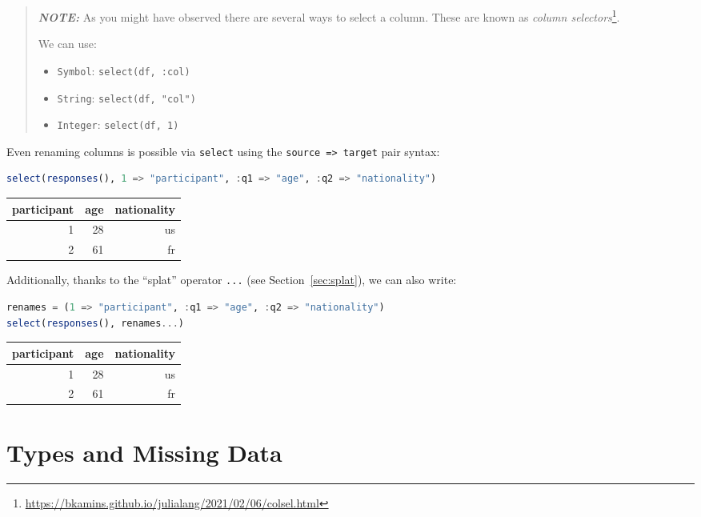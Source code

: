 \documentclass[
  notoc %
]{tufte-book}
\DeclareRobustCommand{\href}[2]{#2\footnote{\url{#1}}}
\newcommand{\passthrough}[1]{#1}
\begin{document}
\begin{quote}
\textbf{\emph{NOTE:}} As you might have observed there are several ways
to select a column. These are known as
\href{https://bkamins.github.io/julialang/2021/02/06/colsel.html}{\emph{column
selectors}}.

We can use:

\begin{itemize}
\item
  \passthrough{\lstinline!Symbol!}:
  \passthrough{\lstinline!select(df, :col)!}
\item
  \passthrough{\lstinline!String!}:
  \passthrough{\lstinline!select(df, "col")!}
\item
  \passthrough{\lstinline!Integer!}:
  \passthrough{\lstinline!select(df, 1)!}
\end{itemize}
\end{quote}

Even renaming columns is possible via \passthrough{\lstinline!select!}
using the \passthrough{\lstinline!source => target!} pair syntax:

\begin{lstlisting}[language=Julia]
select(responses(), 1 => "participant", :q1 => "age", :q2 => "nationality")
\end{lstlisting}

\begin{longtable}[]{@{}rrr@{}}
\toprule
participant & age & nationality \\
\midrule
\endhead
1 & 28 & us \\
2 & 61 & fr \\
\bottomrule
\end{longtable}

Additionally, thanks to the ``splat'' operator
\passthrough{\lstinline!...!} (see Section~\ref{sec:splat}), we can also
write:

\begin{lstlisting}[language=Julia]
renames = (1 => "participant", :q1 => "age", :q2 => "nationality")
select(responses(), renames...)
\end{lstlisting}

\begin{longtable}[]{@{}rrr@{}}
\toprule
participant & age & nationality \\
\midrule
\endhead
1 & 28 & us \\
2 & 61 & fr \\
\bottomrule
\end{longtable}

\hypertarget{sec:missing_data}{%
\section{Types and Missing Data}\label{sec:missing_data}}
\end{document}
